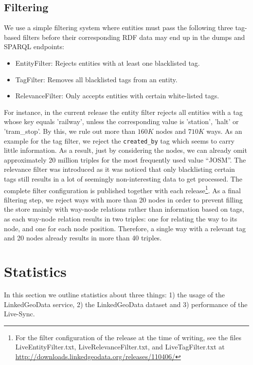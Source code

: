 \subsection{Filtering}
\label{sec:filtering}
We use a simple filtering system where entities must pass the following
three tag-based filters before their corresponding RDF data may end up in the
dumps and SPARQL endpoints:
\begin{itemize}
  \item{EntityFilter}: Rejects entities with at least one blacklisted tag.
  \item{TagFilter}: Removes all blacklisted tags from an entity.
  \item{RelevanceFilter}: Only accepts entities with certain white-listed tags.
\end{itemize}
For instance, in the current release the entity filter rejects all entities with
a tag whose key equals 'railway', unless the corresponding value is 'station',
'halt' or 'tram\_stop'. By this, we rule out more than $160K$ nodes and
$710K$ ways. As an example for the tag filter, we reject the
\texttt{created\_by} tag which
seems to carry little information. As a result, just by considering the nodes,
we can already omit approximately 20 million triples for the most frequently used
value ``JOSM''. The relevance filter was introduced as it was noticed that only
blacklisting certain tags still results in a lot of seemingly non-interesting data to get processed. The complete filter configuration is published
together with each
release\footnote{For the filter configuration of the release at the time of writing, see the files LiveEntityFilter.txt, LiveRelevanceFilter.txt, and LiveTagFilter.txt at \url{http://downloads.linkedgeodata.org/releases/110406/}}.
As a final
filtering step, we reject ways with more than 20 nodes in order to prevent
filling the store mainly with way-node relations rather than information based
on tags, as each way-node relation results in two triples: one for relating the
way to its node, and one for each node position. Therefore, a single way with a
relevant tag and 20 nodes already results in more than 40 triples.


\section{Statistics}
\label{sec:stats}

In this section we outline statistics about three things: 1) the usage of the
LinkedGeoData service, 2) the LinkedGeoData dataset and 3) performance of
the Live-Sync.

